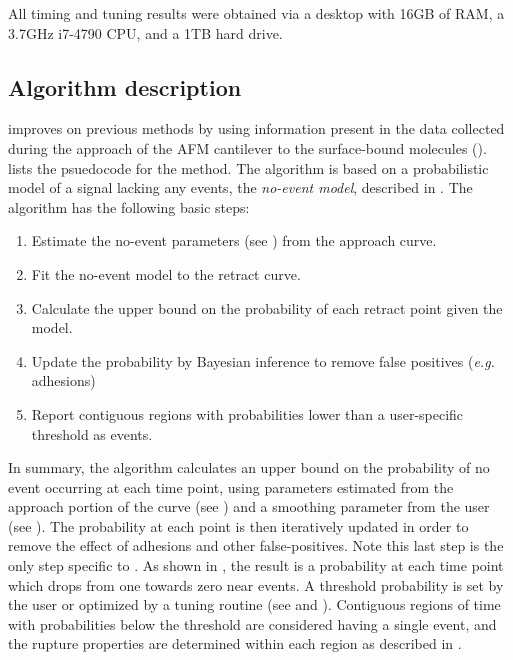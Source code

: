 All timing and tuning results were obtained via a desktop with 16GB of RAM, a 3.7GHz i7-4790 CPU, and a 1TB hard drive. 

\subsection{Algorithm description}

\name{} improves on previous methods by using information present in the data collected during the approach of the AFM cantilever to the surface-bound molecules ().   lists the psuedocode for the method. The algorithm is based on a probabilistic model of a signal lacking any events, the \textit{no-event model}, described in . The algorithm has the following basic steps:

\begin{enumerate}
\item Estimate the no-event parameters (see ) from the approach curve.
\item Fit the no-event model to the retract curve.
\item Calculate the upper bound on the probability of each retract point given the model.
\item Update the probability by Bayesian inference to remove false positives (\textit{e.g.} \singlemol{} adhesions)
\item Report contiguous regions with probabilities lower than a user-specific threshold as events.
\end{enumerate}

 In summary, the algorithm calculates an upper bound on the probability of no event occurring at each time point, using parameters estimated from the approach portion of the curve (see ) and a smoothing parameter from the user (see ). The probability at each point is then iteratively updated in order to remove the effect of adhesions and other false-positives. Note this last step is the only step specific to \singlemol{}. As shown in , the result is a probability at each time point which drops from one towards zero near events. A threshold probability is set by the user or optimized by a tuning routine (see  and ). Contiguous regions of time with probabilities below the threshold are considered having a single event, and the rupture properties are determined within each region as described in .


